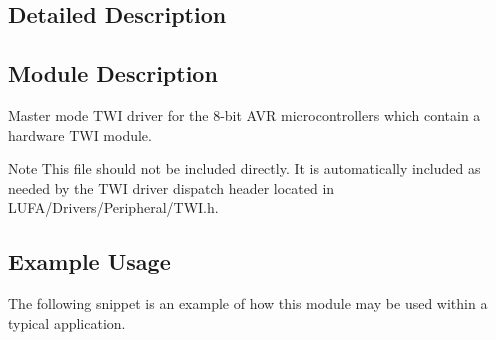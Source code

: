 \subsection{Detailed Description}
\hypertarget{group__Group__TWI__AVR8_Sec_ModDescription}{}\subsection{Module Description}\label{group__Group__TWI__AVR8_Sec_ModDescription}
Master mode T\+WI driver for the 8-\/bit A\+VR microcontrollers which contain a hardware T\+WI module.

\begin{DoxyNote}{Note}
This file should not be included directly. It is automatically included as needed by the T\+WI driver dispatch header located in L\+U\+F\+A/\+Drivers/\+Peripheral/\+T\+W\+I.\+h.
\end{DoxyNote}
\hypertarget{group__Group__TWI__AVR8_Sec_ExampleUsage}{}\subsection{Example Usage}\label{group__Group__TWI__AVR8_Sec_ExampleUsage}
The following snippet is an example of how this module may be used within a typical application.

